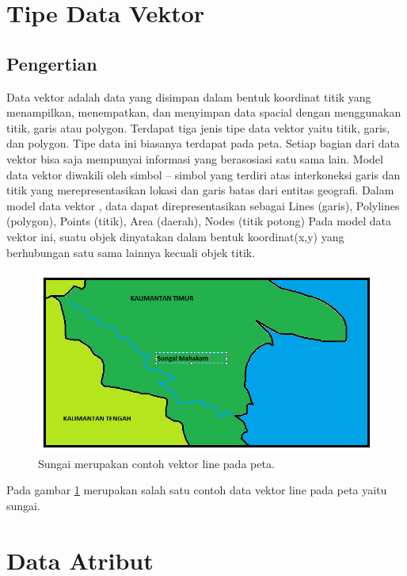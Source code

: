 \section{Tipe Data Vektor}
\subsection{Pengertian}
Data vektor adalah data yang disimpan dalam bentuk koordinat titik yang menampilkan, 
menempatkan, dan menyimpan data spacial dengan menggunakan titik, garis atau polygon.
Terdapat tiga jenis tipe data vektor yaitu titik, garis, dan polygon. Tipe data ini 
biasanya terdapat pada peta. Setiap bagian dari data vektor bisa saja mempunyai 
informasi yang berasosiasi satu sama lain.
Model data vektor diwakili oleh simbol – simbol yang terdiri atas interkoneksi garis
dan titik yang merepresentasikan lokasi dan garis batas dari entitas geografi. Dalam
model data vektor , data dapat direpresentasikan sebagai Lines (garis), Polylines 
(polygon), Points (titik), Area (daerah), Nodes (titik potong) Pada model data vektor ini, 
suatu objek dinyatakan dalam bentuk koordinat(x,y) yang berhubungan satu sama lainnya kecuali objek titik.
\begin{figure}[ht]
	\centerline{\includegraphics[width=1\textwidth]{figures/sungai.PNG}}
	\caption{Sungai merupakan contoh vektor line pada peta.}
	\label{sungai}
	\end{figure}
   
Pada gambar \ref{sungai} merupakan salah satu contoh data vektor line pada peta yaitu sungai.
\section{Data Atribut}
